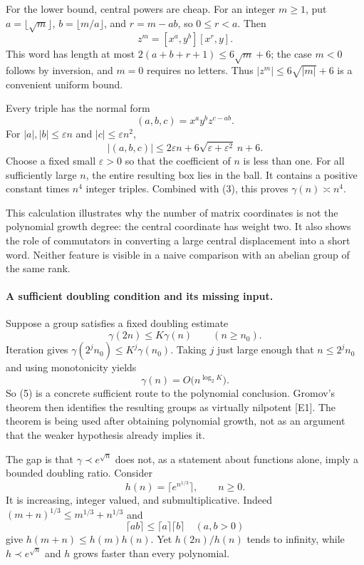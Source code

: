 \documentclass[11pt]{article}
\begin{document}
For the lower bound, central powers are cheap. For an integer $m\ge1$, put $a=\lfloor\sqrt m\rfloor$, $b=\lfloor m/a\rfloor$, and $r=m-ab$, so $0\le r<a$. Then
\[
 z^m=[x^a,y^b][x^r,y].                                    \tag{4}
\]
This word has length at most $2(a+b+r+1)\le6\sqrt m+6$; the case $m<0$ follows by inversion, and $m=0$ requires no letters. Thus $|z^m|\le6\sqrt{|m|}+6$ is a convenient uniform bound.

Every triple has the normal form
\[
 (a,b,c)=x^ay^bz^{c-ab}.
\]
For $|a|,|b|\le\varepsilon n$ and $|c|\le\varepsilon n^2$,
\[
 |(a,b,c)|\le2\varepsilon n
       +6\sqrt{\varepsilon+\varepsilon^2}\,n+6.
\]
Choose a fixed small $\varepsilon>0$ so that the coefficient of $n$ is less than one. For all sufficiently large $n$, the entire resulting box lies in the ball. It contains a positive constant times $n^4$ integer triples. Combined with (3), this proves $\gamma(n)\asymp n^4$.

This calculation illustrates why the number of matrix coordinates is not the polynomial growth degree: the central coordinate has weight two. It also shows the role of commutators in converting a large central displacement into a short word. Neither feature is visible in a naive comparison with an abelian group of the same rank.

\paragraph{A sufficient doubling condition and its missing input.}
Suppose a group satisfies a fixed doubling estimate
\[
 \gamma(2n)\le K\gamma(n)\qquad(n\ge n_0).                 \tag{5}
\]
Iteration gives $\gamma(2^j n_0)\le K^j\gamma(n_0)$. Taking $j$ just large enough that $n\le2^j n_0$ and using monotonicity yields
\[
 \gamma(n)=O\bigl(n^{\log_2 K}\bigr).
\]
So (5) is a concrete sufficient route to the polynomial conclusion. Gromov's theorem then identifies the resulting groups as virtually nilpotent [E1]. The theorem is being used after obtaining polynomial growth, not as an argument that the weaker hypothesis already implies it.

The gap is that $\gamma\prec e^{\sqrt n}$ does not, as a statement about functions alone, imply a bounded doubling ratio. Consider
\[
 h(n)=\lceil e^{n^{1/3}}\rceil,\qquad n\ge0.
\]
It is increasing, integer valued, and submultiplicative. Indeed $(m+n)^{1/3}\le m^{1/3}+n^{1/3}$ and
\[
 \lceil ab\rceil\le\lceil a\rceil\lceil b\rceil
 \quad(a,b>0)
\]
give $h(m+n)\le h(m)h(n)$. Yet $h(2n)/h(n)$ tends to infinity, while $h\prec e^{\sqrt n}$ and $h$ grows faster than every polynomial.
\end{document}
